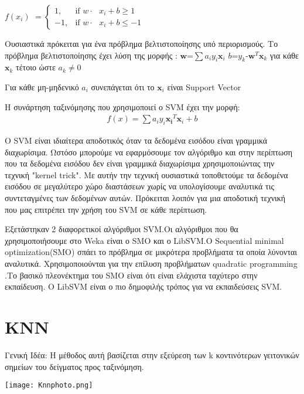  $f(x_i)$ 
$ = \begin{cases} 1, & \mbox{if } w\cdot\mbox{ $x_i +b \geq 1 $} \\ -1, & \mbox{if } w\cdot\mbox{ $x_i +b \leq -1 $} \end{cases} $


 Ουσιαστικά πρόκειται για ένα πρόβλημα βελτιστοποίησης υπό περιορισμούς.
 Το πρόβλημα βελτιστοποίησης έχει λύση της μορφής :
\newline $\boldsymbol  w $=$\sum a_i y_i \boldsymbol x_i $ $b$=$y_k$-$\boldsymbol w^T \boldsymbol x_k$ για κάθε $\boldsymbol x_k$ τέτοιο ώστε $a_k\not= 0$
 
 Για κάθε μη-μηδενικό $a_i$ συνεπάγεται ότι το $\boldsymbol x_i$ είναι Support Vector
 
 Η συνάρτηση ταξινόμησης που χρησιμοποιεί ο SVM έχει την μορφή:
\begin{align*} 
f(x)=\sum a_i y_i \boldsymbol {x_i}^T \boldsymbol x_i +b
\end{align*}

Ο SVM είναι ιδιαίτερα αποδοτικός όταν τα δεδομένα εισόδου είναι γραμμικά διαχωρίσιμα. Ωστόσο μπορούμε να εφαρμόσουμε τον αλγόριθμο και στην περίπτωση που τα δεδομένα εισόδου δεν είναι γραμμικά διαχωρίσιμα χρησιμοποιώντας την τεχνική "kernel trick". Με αυτήν την τεχνική ουσιαστικά τοποθετούμε τα δεδομένα εισόδου σε μεγαλύτερο χώρο διαστάσεων χωρίς να υπολογίσουμε αναλυτικά τις συντεταγμένες των δεδομένων αυτών. Πρόκειται λοιπόν για μια αποδοτική τεχνική που μας επιτρέπει την χρήση του SVM σε κάθε περίπτωση.

Εξετάστηκαν 2 διαφορετικοί αλγόριθμοι SVM.Οι αλγόριθμοι που θα χρησιμοποιήσουμε στο Weka είναι ο SMO και ο LibSVM.O Sequential minimal optimization(SMO) σπάει το πρόβλημα σε μικρότερα προβλήματα τα οποία λύνονται αναλυτικά. Χρησιμοποιούνται για την επίλυση προβλήματων quadratic programming .Το βασικό πλεονέκτημα του SMO είναι ότι είναι ελάχιστα ταχύτερο στην εκπαίδευση. O LibSVM είναι ο πιο δημοφιλής τρόπος για να εκπαιδεύσεις SVM.





 
\section{KNN}

Γενική Ιδέα: Η μέθοδος αυτή βασίζεται στην εξεύρεση των k κοντινότερων γειτονικών σημείων του δείγματος προς ταξινόμηση.

\begin{center}
	\texttt{[image: Knnphoto.png]}
	\label{fig:KNN}  
\end{center}

